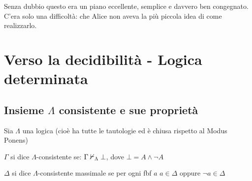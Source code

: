 \begin{savequote}[60mm]
Senza dubbio questo era un piano eccellente, semplice e davvero ben congegnato. \\
C'era solo una difficoltà: che Alice non aveva la più piccola idea di come realizzarlo.
 \end{savequote}


\chapter{Verso la decidibilità - Logica determinata}


\section{Insieme $\Lambda$ consistente e sue proprietà}

Sia $\Lambda$ una logica (cioè ha tutte le tautologie ed è chiusa
rispetto al Modus Ponens)	

$\Gamma$ si dice $\Lambda$-consistente se: $\Gamma\nvdash_{\Lambda}\bot$,
dove $\bot=A\wedge\neg A$

$\Delta$ si dice $\Lambda$-consistente massimale se per ogni fbf
$a$ $a\in\Delta$ oppure $\neg a\in\Delta$ $ $\\


